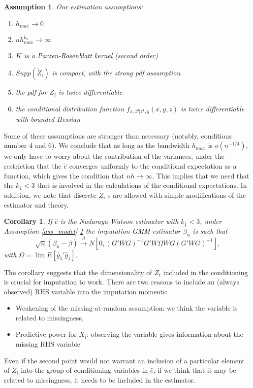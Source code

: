 \documentclass{article}
\newtheorem{assumption}{Assumption}
\newtheorem{corollary}{Corollary}
\theoremstyle{definition}
\theoremstyle{remark}
\begin{document}
\begin{assumption}\label{ass_estimation}
    Our estimation assumptions:
    \begin{enumerate}
        \item $h_{max}\rightarrow 0$
        \item $nh_{max}^{k_z}\rightarrow \infty$
        \item $K$ is a Parzen-Rosenblatt kernel (second order)
        \item $Supp(\tilde{Z}_i)$ is compact, with the strong pdf assumption
        \item the pdf for $Z_i$ is twice differentiable
        \item the conditional distribution function $f_{x, z^0|z^1, y}(x, y,z)$ is twice differentiable with bounded Hessian
    \end{enumerate}
\end{assumption}
Some of these assumptions are stronger than necessary (notably, conditions number 4 and 6). We conclude that as long as the bandwidth $h_{max}$ is $o(n^{-1/4})$, we only have to worry about the contribution of the variances, under the restriction that the $\hat{e}$ converges uniformly to the conditional expectation as a function, which gives the condition that $nh \rightarrow \infty$. This implies that we need that the $k_1<3$ that is involved in the calculations of the conditional expectations. In addition, we note that discrete $\tilde{Z}_i$-s are allowed with simple modifications of the estimator and theory.
\begin{corollary}\label{cor_NWTheory}
	If $\hat{e}$ is the Nadaraya-Watson estimator with $k_1<3$, under Assumption \ref{ass_model}-\ref{ass_estimation} the imputation GMM estimator $\hat{\beta}_n$ is such that
		\[\sqrt{n}(\beta_n-\beta) \stackrel{d}{\rightarrow} N[0, (G'WG)^{-1}G'W \Omega W G (G'WG)^{-1}],
		\]
	with $\Omega= \lim E[\hat{g}_1'\hat{g}_1]$. 
\end{corollary}
The corollary suggests that the dimensionality of $Z_i$ included in the conditioning is crucial for imputation to work. There are two reasons to include an (always observed) RHS variable into the imputation moments:
\begin{itemize}
	\item Weakening of the missing-at-random assumption: we think the variable is related to missingness,
	\item Predictive power for $X_i$: observing the variable gives information about the missing RHS variable
\end{itemize}
Even if the second point would not warrant an inclusion of a particular element of $Z_i$ into the group of conditioning variables in $\hat{e}$, if we think that it may be related to missingness, it needs to be included in the estimator.
\end{document}
